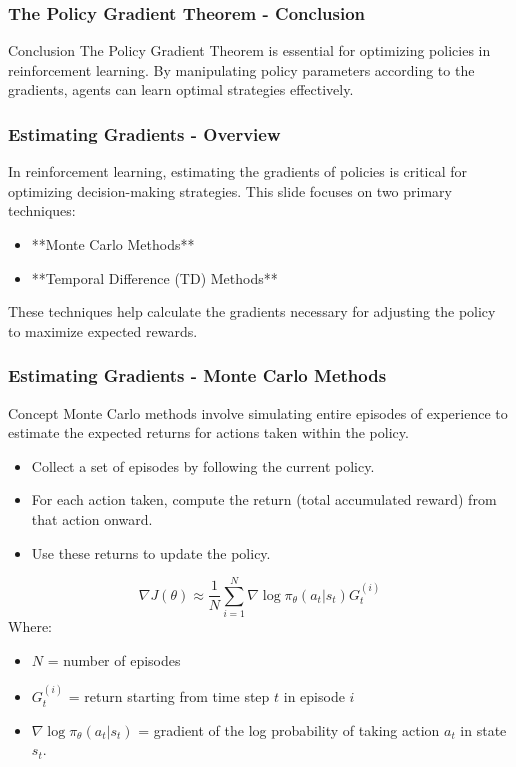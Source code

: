 \documentclass[aspectratio=169]{beamer}
\begin{document}
\begin{frame}[fragile]
    \frametitle{The Policy Gradient Theorem - Conclusion}
    \begin{block}{Conclusion}
        The Policy Gradient Theorem is essential for optimizing policies in reinforcement learning. 
        By manipulating policy parameters according to the gradients, agents can learn optimal strategies effectively.
    \end{block}
\end{frame}

\begin{frame}[fragile]
    \frametitle{Estimating Gradients - Overview}
    In reinforcement learning, estimating the gradients of policies is critical for optimizing decision-making strategies. This slide focuses on two primary techniques: 

    \begin{itemize}
        \item **Monte Carlo Methods**
        \item **Temporal Difference (TD) Methods**
    \end{itemize}

    These techniques help calculate the gradients necessary for adjusting the policy to maximize expected rewards.
\end{frame}

\begin{frame}[fragile]
    \frametitle{Estimating Gradients - Monte Carlo Methods}
    \begin{block}{Concept}
        Monte Carlo methods involve simulating entire episodes of experience to estimate the expected returns for actions taken within the policy.
    \end{block}

    \begin{itemize}
        \item Collect a set of episodes by following the current policy.
        \item For each action taken, compute the return (total accumulated reward) from that action onward.
        \item Use these returns to update the policy.
    \end{itemize}

    \begin{equation}
        \nabla J(\theta) \approx \frac{1}{N} \sum_{i=1}^{N} \nabla \log \pi_{\theta}(a_t | s_t) G_t^{(i)}
    \end{equation}
    Where:
    \begin{itemize}
        \item $N$ = number of episodes
        \item $G_t^{(i)}$ = return starting from time step $t$ in episode $i$
        \item $\nabla \log \pi_{\theta}(a_t | s_t)$ = gradient of the log probability of taking action $a_t$ in state $s_t$.
    \end{itemize}
\end{frame}
\end{document}
